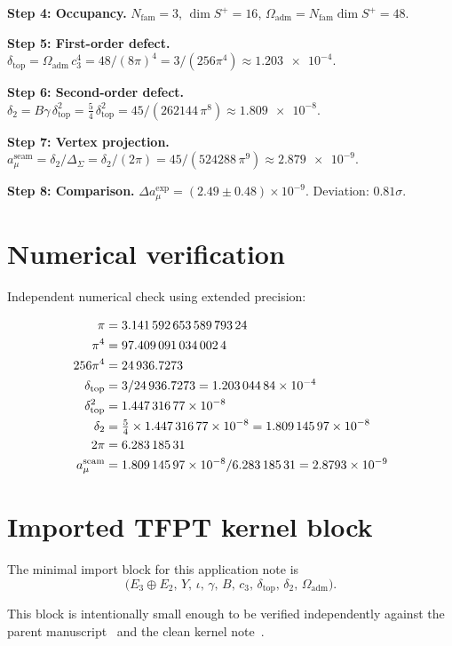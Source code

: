 \documentclass[11pt,a4paper]{article}
\theoremstyle{definition}
\theoremstyle{remark}
\newcommand{\Seam}{\Sigma}
\newcommand{\inv}{\iota}
\newcommand{\cthree}{c_3}
\newcommand{\deltatop}{\delta_{\mathrm{top}}}
\newcommand{\gammaY}{\gamma}
\newcommand{\Oadm}{\Omega_{\mathrm{adm}}}
\numberwithin{equation}{section}
\begin{document}
\textbf{Step 4: Occupancy.}
$N_{\mathrm{fam}}=3$, $\dim S^+=16$,
$\Oadm=N_{\mathrm{fam}}\dim S^+=48$.

\textbf{Step 5: First-order defect.}
$\deltatop=\Oadm\,\cthree^4=48/(8\pi)^4=3/(256\pi^4)\approx\num{1.203e-4}$.

\textbf{Step 6: Second-order defect.}
$\delta_2=B\gammaY\,\deltatop^2=\frac54\,\deltatop^2
=45/(262144\,\pi^8)\approx\num{1.809e-8}$.

\textbf{Step 7: Vertex projection.}
$a_\mu^{\mathrm{seam}}=\delta_2/\Delta_\Seam=\delta_2/(2\pi)
=45/(524288\,\pi^9)\approx\num{2.879e-9}$.

\textbf{Step 8: Comparison.}
$\Delta a_\mu^{\exp}=(2.49\pm0.48)\times10^{-9}$.
Deviation: $0.81\sigma$.


\section{Numerical verification}\label{app:numerics}

Independent numerical check using extended precision:

\begin{align}
\pi &= \num{3.14159265358979324}\notag\\
\pi^4 &= \num{97.4090910340024}\notag\\
256\pi^4 &= \num{24936.7273}\notag\\
\deltatop &= 3/\num{24936.7273} = \num{1.20304484e-4}\notag\\
\deltatop^2 &= \num{1.44731677e-8}\notag\\
\delta_2 &= \tfrac54\times\num{1.44731677e-8} = \num{1.80914597e-8}\notag\\
2\pi &= \num{6.28318531}\notag\\
a_\mu^{\mathrm{seam}} &= \num{1.80914597e-8}/\num{6.28318531}
= \num{2.8793e-9}\label{eq:check}
\end{align}


\section{Imported TFPT kernel block}\label{app:import}

The minimal import block for this application note is
\[
\bigl(
E_3\oplus E_2,\,
Y,\,
\inv,\,
\gammaY,\,
B,\,
\cthree,\,
\deltatop,\,
\delta_2,\,
\Oadm
\bigr).
\]
\begin{sloppypar}
This block is intentionally small enough to be verified
independently against the parent manuscript~\cite{TFPT31}
and the clean kernel note~\cite{TFPTkernel}.
\end{sloppypar}
\end{document}
